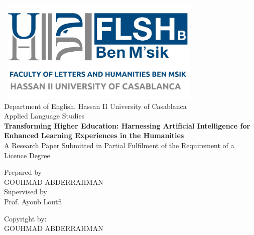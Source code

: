 \begin{titlepage}
  \centering
  \includegraphics[width=10cm, height=5cm]{./cover/univlogo.jpg} \\
  \centering
  Department of English, Hassan II University of Casablanca \\
  Applied Language Studies \\
  \vspace*{2cm}
  \textbf{\huge Transforming Higher Education: Harnessing Artificial Intelligence for Enhanced Learning Experiences in the Humanities} \\
  \vspace*{2cm}
  A Research Paper Submitted in Partial Fulfilment of the Requirement of a Licence Degree \\
  \vspace*{7cm}

  \begin{center}
    Prepared by\\ GOUHMAD
    ABDERRAHMAN\\ Supervised by \\
    Prof. Ayoub Loutfi \\
  \end{center}
  \newpage

  \vspace*{20cm}
  Copyright by:\\
  GOUHMAD ABDERRAHMAN

  \vspace*{\fill}
  \mydate
\end{titlepage}